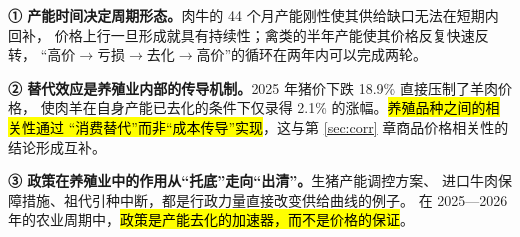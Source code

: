 \begin{keybox}[本章三个结论]
\normalsize
\textbf{① 产能时间决定周期形态。}肉牛的 44 个月产能刚性使其供给缺口无法在短期内回补，
价格上行一旦形成就具有持续性；禽类的半年产能使其价格反复快速反转，
“高价$\to$亏损$\to$去化$\to$高价”的循环在两年内可以完成两轮。\par\vspace{3pt}
\textbf{② 替代效应是养殖业内部的传导机制。}2025 年猪价下跌 18.9\% 直接压制了羊肉价格，
使肉羊在自身产能已去化的条件下仅录得 2.1\% 的涨幅。\hl{养殖品种之间的相关性通过
“消费替代”而非“成本传导”实现}，这与第 \ref{sec:corr} 章商品价格相关性的结论形成互补。\par\vspace{3pt}
\textbf{③ 政策在养殖业中的作用从“托底”走向“出清”。}生猪产能调控方案、
进口牛肉保障措施、祖代引种中断，都是行政力量直接改变供给曲线的例子。
在 2025---2026 年的农业周期中，\hl{政策是产能去化的加速器，而不是价格的保证}。
\end{keybox}
